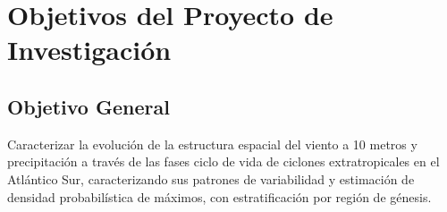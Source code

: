 \section{Objetivos del Proyecto de Investigación}
\subsection{Objetivo General}
%
%
Caracterizar la evolución de la estructura espacial del viento a 10 metros y precipitación a través de las fases ciclo de vida de ciclones extratropicales en el Atlántico Sur, caracterizando sus patrones de variabilidad y estimación de densidad probabilística de máximos, con estratificación por región de génesis.
%
